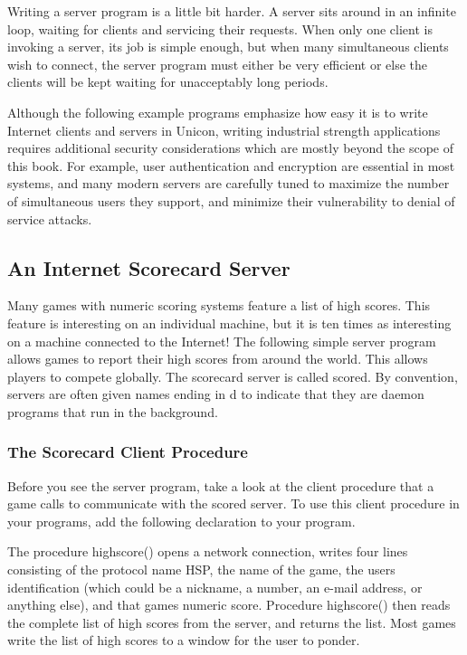Writing a server program is a little bit harder. A server sits around in
an infinite loop, waiting for clients and servicing their requests.
When only one client is invoking a server, its job is simple enough,
but when many simultaneous clients wish to connect, the server program
must either be very efficient or else the clients will be kept waiting
for unacceptably long periods.

Although the following example programs emphasize how easy it is to
write Internet clients and servers in Unicon, writing
{\textquotedbl}industrial strength{\textquotedbl} applications requires
additional security considerations which are mostly beyond the scope of
this book. For example, user authentication and encryption are
essential in most systems, and many modern servers are carefully tuned
to maximize the number of simultaneous users they support, and minimize
their vulnerability to denial of service attacks.

\subsection{An Internet Scorecard Server}
Many games with numeric scoring systems feature a list of high scores.
This feature is interesting on an individual machine, but it is ten
times as interesting on a machine connected to the Internet! The
following simple server program allows games to report
their high scores from around the world. This allows players to compete
globally. The scorecard server is called \textsf{scored}. By
convention, servers are often given names ending in
{\textquotedbl}d{\textquotedbl} to indicate that they are daemon
programs that run in the background.

\subsubsection{The Scorecard Client Procedure}
Before you see the server program, take a look at the client procedure
that a game calls to communicate with the \textsf{scored} server. To
use this client procedure in your programs, add the following
declaration to your program.


The procedure \textsf{highscore()} opens a network connection, writes
four lines consisting of the protocol name
{\textquotedbl}HSP{\textquotedbl}, the name of the game, the
user{\textquotesingle}s identification (which could be a nickname, a
number, an e-mail address, or anything else), and that
game{\textquotesingle}s numeric score. Procedure \textsf{highscore()}
then reads the complete list of high scores from the server, and
returns the list. Most games write the list of high scores to a window
for the user to ponder.

